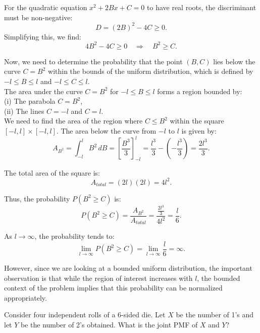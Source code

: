 \begin{solution}
    For the quadratic equation \( x^2 + 2Bx + C = 0 \) to have real roots, the discriminant must be non-negative:
    \[
    D = (2B)^2 - 4C \geq 0.
    \]
    Simplifying this, we find:
    \[
    4B^2 - 4C \geq 0 \quad \Rightarrow \quad B^2 \geq C.
    \]
    
    Now, we need to determine the probability that the point \( (B, C) \) lies below the curve \( C = B^2 \) within the bounds of the uniform distribution, which is defined by \( -l \leq B \leq l \) and \( -l \leq C \leq l \).\\

    The area under the curve \( C = B^2 \) for \( -l \leq B \leq l \) forms a region bounded by:\\

    (i) The parabola \( C = B^2 \),\\
    (ii) The lines \( C = -l \) and \( C = l \).\\

    We need to find the area of the region where \( C \leq B^2 \) within the square \( [-l, l] \times [-l, l] \). The area below the curve from \( -l \) to \( l \) is given by:
    \[
    A_{B^2} = \int_{-l}^{l} B^2 \, dB = \left[ \frac{B^3}{3} \right]_{-l}^{l} = \frac{l^3}{3} - \left(-\frac{l^3}{3}\right) = \frac{2l^3}{3}.
    \]

    The total area of the square is:
    \[
    A_{total} = (2l)(2l) = 4l^2.
    \]

    Thus, the probability \( P(B^2 \geq C) \) is:
    \[
    P(B^2 \geq C) = \frac{A_{B^2}}{A_{total}} = \frac{\frac{2l^3}{3}}{4l^2} = \frac{l}{6}.
    \]

    As \( l \to \infty \), the probability tends to:
    \[
    \lim_{l \to \infty} P(B^2 \geq C) = \lim_{l \to \infty} \frac{l}{6} = \infty.
    \]

    However, since we are looking at a bounded uniform distribution, the important observation is that while the region of interest increases with \( l \), the bounded context of the problem implies that this probability can be normalized appropriately.
\end{solution}

\begin{exercise}
Consider four independent rolls of a 6-sided die. Let \(X\) be the number of 1’s and let \(Y\) be the number of 2’s obtained. What is the joint PMF of \(X\) and \(Y\)?
\end{exercise}

